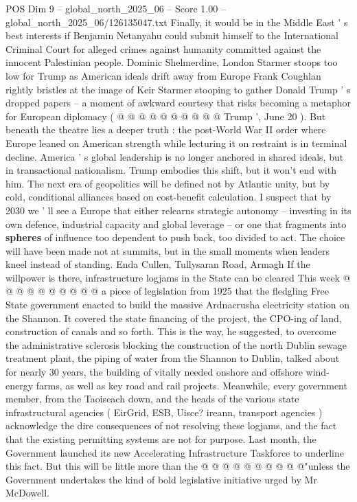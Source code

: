 \begin{textsample}{POS Dim 9 – global\_north\_2025\_06 – Score 1.00 – global\_north\_2025\_06/126135047.txt}
Finally, it would be in the Middle East ' s best interests if Benjamin Netanyahu could submit himself to the International Criminal Court for alleged crimes against humanity committed against the innocent Palestinian people.
Dominic Shelmerdine, London Starmer stoops too low for Trump as American ideals drift away from Europe Frank Coughlan rightly bristles at the image of Keir Starmer stooping to gather Donald Trump ' s dropped papers -- a moment of awkward courtesy that risks becoming a metaphor for European diplomacy ( @ @ @ @ @ @ @ @ @ @ Trump ', June 20 ).
But beneath the theatre lies a deeper truth : the post-World War II order where Europe leaned on American strength while lecturing it on restraint is in terminal decline.
America ' s global leadership is no longer anchored in shared ideals, but in transactional nationalism.
Trump embodies this shift, but it won't end with him.
The next era of geopolitics will be defined not by Atlantic unity, but by cold, conditional alliances based on cost-benefit calculation.
I suspect that by 2030 we ' ll see a Europe that either relearns strategic autonomy -- investing in its own defence, industrial capacity and global leverage -- or one that fragments into \textbf{spheres} of influence too dependent to push back, too divided to act.
The choice will have been made not at summits, but in the small moments when leaders kneel instead of standing.
Enda Cullen, Tullysaran Road, Armagh If the willpower is there, infrastructure logjams in the State can be cleared This week @ @ @ @ @ @ @ @ @ @ a piece of legislation from 1925 that the fledgling Free State government enacted to build the massive Ardnacrusha electricity station on the Shannon.
It covered the state financing of the project, the CPO-ing of land, construction of canals and so forth.
This is the way, he suggested, to overcome the administrative sclerosis blocking the construction of the north Dublin sewage treatment plant, the piping of water from the Shannon to Dublin, talked about for nearly 30 years, the building of vitally needed onshore and offshore wind-energy farms, as well as key road and rail projects.
Meanwhile, every government member, from the Taoiseach down, and the heads of the various state infrastructural agencies ( EirGrid, ESB, Uisce? ireann, transport agencies ) acknowledge the dire consequences of not resolving these logjams, and the fact that the existing permitting systems are not for purpose.
Last month, the Government launched its new Accelerating Infrastructure Taskforce to underline this fact.
But this will be little more than the @ @ @ @ @ @ @ @ @ @"unless the Government undertakes the kind of bold legislative initiative urged by Mr McDowell.

\end{textsample}
